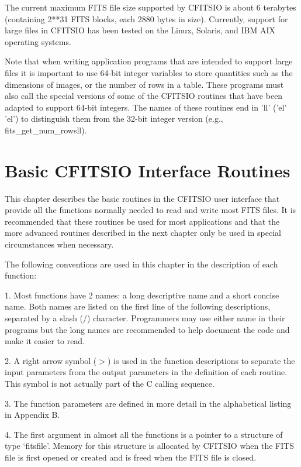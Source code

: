 \documentclass[11pt]{book}
\begin{document}
The current maximum FITS file size supported by  CFITSIO
is about 6 terabytes (containing
2**31 FITS blocks, each 2880 bytes in size). Currently, support for large
files in CFITSIO has been tested on the Linux, Solaris, and IBM AIX
operating systems.

Note that when writing application programs that are intended to support
large files it is important to use 64-bit integer variables
to store quantities such as the dimensions of images, or the number of
rows in a table.  These programs must also call the special versions
of some of the CFITSIO routines that have been adapted to
support 64-bit integers.  The names of these routines end in
'll' ('el' 'el') to distinguish them from the 32-bit integer
version (e.g.,  fits\_get\_num\_rowsll).


\chapter{Basic CFITSIO Interface Routines }

This chapter describes the basic routines in the CFITSIO user interface
that provide all the functions normally needed to read and write most
FITS files.  It is recommended that these routines be used for most
applications and that the more advanced routines described in the
next chapter only be used in special circumstances when necessary.

The following conventions are used in this chapter in the description
of each function:

1. Most functions have 2 names: a long descriptive name and a short
concise name.  Both names are listed on the first line of the following
descriptions, separated by a slash (/) character.  Programmers may use
either name in their programs but the long names are recommended to
help document the code and make it easier to read.

2. A right arrow symbol ($>$) is used in the function descriptions to
separate the input parameters from the output parameters in the
definition of each routine.  This symbol is not actually part of the C
calling sequence.

3. The function parameters are defined in more detail in the
alphabetical listing in Appendix B.

4.  The first argument in almost all the functions is a pointer to a
structure of type `fitsfile'.  Memory for this structure is allocated
by CFITSIO when the FITS file is first opened or created and is freed
when the FITS file is closed.
\end{document}
